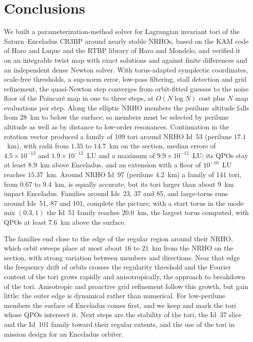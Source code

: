 \documentclass[11pt]{article}
\begin{document}
\section{Conclusions}\label{sec:conclusions}
We built a parameterization-method solver for Lagrangian invariant tori of the Saturn--Enceladus
CR3BP around nearly stable NRHOs, based on the KAM code of Haro and Luque and the RTBP library of
Haro and Mondelo, and verified it on an integrable twist map with exact solutions and against
finite differences and an independent dense Newton solver. With torus-adapted symplectic
coordinates, scale-free thresholds, a sup-norm error, low-pass filtering, stall detection and grid
refinement, the quasi-Newton step converges from orbit-fitted guesses to the noise floor of the
Poincar\'e map in one to three steps, at $O(N\log N)$ cost plus $N$ map evaluations per step.
Along the elliptic NRHO members the perilune altitude falls from $28$~km to below the surface, so
members must be selected by perilune altitude as well as by distance to low-order resonances.
Continuation in the rotation vector produced a family of 109 tori around NRHO Id~53 (perilune
$17.1$~km), with radii from $1.35$ to $14.7$~km on the section, median errors of
$4.5\times10^{-13}$ and $1.9\times10^{-12}$~LU and a maximum of $9.9\times10^{-12}$~LU; its QPOs
stay at least $8.9$~km above Enceladus, and an extension with a floor of $10^{-10}$~LU reaches
$15.37$~km. Around NRHO Id~97 (perilune $4.2$~km) a family of 141 tori, from $0.67$ to
$9.4$~km, is equally accurate, but its tori larger than about $9$~km impact Enceladus. Families
around Ids~23, 37 and 85, and large-torus runs around Ids~51, 87 and 101, complete the picture; with
a start torus in the mode mix $(0.3,1)$ the Id~51 family reaches $20.0$~km, the largest torus
computed, with QPOs at least $7.6$~km above the surface.

The families end close to the edge of the regular region around their NRHO, which orbit sweeps
place at most about $16$ to $21$~km from the NRHO on the section, with strong variation between
members and directions. Near that edge the frequency drift of orbits crosses the regularity
threshold and the Fourier content of the tori grows rapidly and anisotropically, the approach to
breakdown of the tori. Anisotropic and proactive grid refinement follow this growth, but gain
little: the outer edge is dynamical rather than numerical. For low-perilune members the surface of
Enceladus comes first, and we keep and mark the tori whose QPOs intersect it. Next steps are the
stability of the tori, the Id~37 slice and the Id~101 family toward their regular extents, and the
use of the tori in mission design for an Enceladus orbiter.
\end{document}
